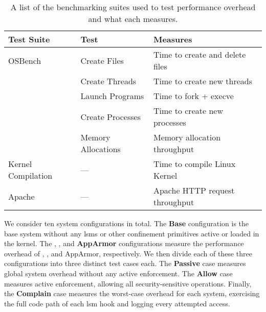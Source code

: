 \begin{table}[htpb]
  \centering
  \caption[List of benchmarking suites and what they measure]{
    A list of the benchmarking suites used to test performance overhead and what each
    measures.
  }%
  \label{tab:suites}
  \begin{tabular}{llp{3in}}
  \toprule
  Test Suite & Test & Measures \\
  \midrule
  OSBench                    & Create Files       & Time to create and delete files \\
                             & Create Threads     & Time to create new threads \\
                             & Launch Programs    & Time to fork + execve \\
                             & Create Processes   & Time to create new processes \\
                             & Memory Allocations & Memory allocation throughput \\
  Kernel Compilation         & ---                & Time to compile Linux Kernel \\
  Apache                     & ---                & Apache HTTP request throughput \\
  \bottomrule
  \end{tabular}
\end{table}

We consider ten system configurations in total. The \textbf{Base} configuration is the
base system without any \glspl{lsm} or other confinement primitives active or loaded in
the kernel. The \textbf{\bpfbox}, \textbf{\bpfcontain}, and \textbf{AppArmor}
configurations measure the performance overhead of \bpfbox{}, \bpfcontain{}, and AppArmor,
respectively. We then divide each of these three configurations into three distinct
test cases each. The \textbf{Passive} case measures global system overhead
without any active enforcement. The \textbf{Allow} case measures active
enforcement, allowing all security-sensitive operations. Finally, the \textbf{Complain}
case measures the worst-case overhead for each system, exercising the full code
path of each \gls{lsm} hook and logging every attempted access.

